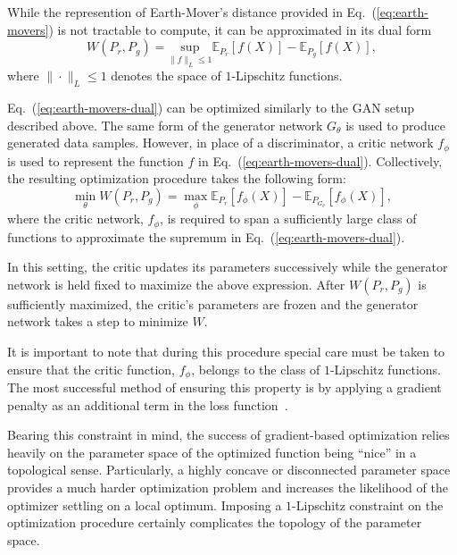 \documentclass[letterpaper]{article} %
\begin{document}
While the represention of Earth-Mover's distance provided in Eq.~(\ref{eq:earth-movers}) is not tractable to compute, it can be approximated in its dual form \cite{villani2008optimal}
\begin{equation}\label{eq:earth-movers-dual}
W(P_r, P_g) = \underset{\|f\|_L \leq 1}{\text{sup}} \mathbb{E}_{P_r} \left[ f(X) \right] - \mathbb{E}_{P_g} \left[ f(X) \right],
\end{equation}
where $\|\cdot\|_L \leq 1$ denotes the space of $1$-Lipschitz functions.

Eq.~(\ref{eq:earth-movers-dual}) can be optimized similarly to the GAN setup described above. The same form of the generator network $G_\theta$ is used to produce generated data samples. However, in place of a discriminator, a critic network $f_\phi$ is used to represent the function $f$ in Eq.~(\ref{eq:earth-movers-dual}). Collectively, the resulting optimization procedure takes the following form:
\begin{equation}\label{eq:wgan-loss}
\min_{\theta} W(P_r, P_g) = \max_{\phi}  \mathbb{E}_{P_r} \left[ f_\phi(X) \right] - \mathbb{E}_{P_{G_\theta}} \left[ f_\phi(X) \right],
\end{equation}
where the critic network, $f_\phi$, is required to span a sufficiently large class of functions to approximate the supremum in Eq.~(\ref{eq:earth-movers-dual}).

In this setting, the critic updates its parameters successively while the generator network is held fixed to maximize the above expression. After $W(P_r, P_g)$ is sufficiently maximized, the critic's parameters are frozen and the generator network takes a step to minimize $W$.

It is important to note that during this procedure special care must be taken to ensure that the critic function, $f_\phi$, belongs to the class of $1$-Lipschitz functions. The most successful method of ensuring this property is by applying a gradient penalty as an additional term in the loss function~\cite{Gulrajani2017ImprovedTO}.

Bearing this constraint in mind, the success of gradient-based optimization relies heavily on the parameter space of the optimized function being ``nice'' in a topological sense. Particularly, a highly concave or disconnected parameter space provides a much harder optimization problem and increases the likelihood of the optimizer settling on a local optimum. Imposing a $1$-Lipschitz constraint on the optimization procedure certainly complicates the topology of the parameter space.
\end{document}
